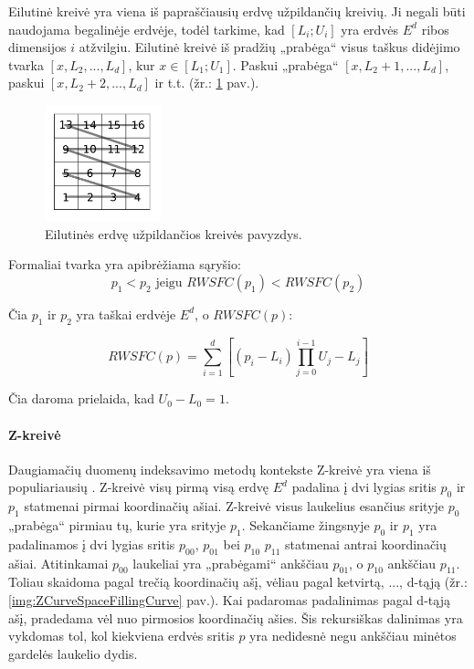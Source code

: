 Eilutinė kreivė yra viena iš papraščiausių erdvę užpildančių kreivių.
Ji negali būti naudojama begalinėje erdvėje, todėl tarkime, kad $[L_i; U_i]$ yra erdvės $E^d$ ribos dimensijos $i$ atžvilgiu.
Eilutinė kreivė iš pradžių „prabėga“ visus taškus didėjimo tvarka $[x, L_2, ..., L_d]$, kur $x \in [L_1; U_1]$.
Paskui „prabėga“ $[x, L_2 + 1, ..., L_d]$, paskui $[x, L_2 + 2, ..., L_d]$ ir t.t. (žr.: \ref{img:RowWiseSpaceFillingCurve} pav.).

\begin{figure}[H]
\begin{center}
\includegraphics[width=0.3\textwidth]{img/RowWiseSpaceFillingCurve.png}
\caption{Eilutinės erdvę užpildančios kreivės pavyzdys.}
\label{img:RowWiseSpaceFillingCurve}
\end{center}
\end{figure}


Formaliai tvarka yra apibrėžiama sąryšio:
\begin{equation}
	p_1 < p_2 \text{ jeigu } RWSFC(p_1) < RWSFC(p_2)
\label{eq:RowWiseSFCComparison}
\end{equation}

Čia $p_1$ ir $p_2$ yra taškai erdvėje $E^d$, o $RWSFC(p)$:

\begin{equation}
	RWSFC(p) = \sum_{i=1}^{d} [(p_i - L_i) \prod_{j=0}^{i - 1}U_j - L_j]
\label{eq:RowWiseSFCValue}
\end{equation}

Čia daroma prielaida, kad $U_0 - L_0 = 1$.



\paragraph{Z-kreivė}

Daugiamačių duomenų indeksavimo metodų kontekste Z-kreivė yra viena iš populiariausių \cite{ramsak2000integrating}.
Z-kreivė visų pirmą visą erdvę $E^d$ padalina į dvi lygias sritis $p_0$ ir $p_1$ statmenai pirmai koordinačių ašiai.
Z-kreivė visus laukelius esančius srityje $p_0$ „prabėga“ pirmiau tų, kurie yra srityje $p_1$.
Sekančiame žingsnyje $p_0$ ir $p_1$ yra padalinamos į dvi lygias sritis $p_{00}$, $p_{01}$ bei $p_{10}$ $p_{11}$ statmenai antrai koordinačių ašiai.
Atitinkamai $p_{00}$ laukeliai yra „prabėgami“ ankščiau $p_{01}$, o $p_{10}$ ankščiau $p_{11}$.
Toliau skaidoma pagal trečią koordinačių ašį, vėliau pagal ketvirtą, ..., d-tąją (žr.: \ref{img:ZCurveSpaceFillingCurve} pav.).
Kai padaromas padalinimas pagal d-tąją ašį, pradedama vėl nuo pirmosios koordinačių ašies.
Šis rekursiškas dalinimas yra vykdomas tol, kol kiekviena erdvės sritis $p$ yra nedidesnė negu ankščiau minėtos gardelės laukelio dydis.

